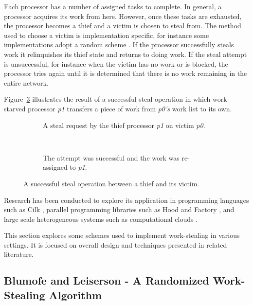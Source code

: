 Each processor has a number of assigned tasks to complete. In general, a processor acquires its work from here.
However, once these tasks are exhausted, the processor becomes a \gls{thief} and a \gls{victim} is chosen to steal from. 
The method used to choose a victim is implementation specific, for instance some implementations adopt a random scheme \cite{blumleis , jliff, narora}.
If the processor successfully steals work it relinquishes its thief state and returns to doing work.
If the steal attempt is unsuccessful, for instance when the victim has no work or is blocked, the processor tries again
until it is determined that there is no work remaining in the entire network. 

Figure~\ref{fig:stealoperation} illustrates the result of a successful steal operation in which work-starved processor \textit{p1} transfers a piece
of work from \textit{p0's} work list to its own. %

\begin{figure}[h]
\centering
\begin{subfigure}[b]{0.4\textwidth}
  \centering    
  
  \caption{
    \tiny A steal request by the thief processor \textit{p1} on victim \textit{p0}.
  }
  \label{fig:stealreq}
\end{subfigure}
~~~~~~ %
\begin{subfigure}[b]{0.4\textwidth}
  \centering
  
  \caption{
    \tiny The attempt was successful and the work was re-assigned to \textit{p1}.
  }
  \label{fig:stealsuccess}
\end{subfigure}
\caption{
    A successful steal operation between a thief and its victim.
  }
\label{fig:stealoperation}
\end{figure}

Research has been conducted to explore its application in programming languages such as Cilk \cite{blumleis}, 
parallel programming libraries such as Hood \cite{hoodlib} and Factory \cite{factorylib}, 
and large scale heterogeneous systems such as computational clouds \cite{scalesthesis}.

This section explores some schemes used to implement work-stealing in various settings. It is focused on overall design and 
techniques presented in related literature. 

\subsection{Blumofe and Leiserson - A Randomized Work-Stealing Algorithm}
\label{sec:randscheme}

